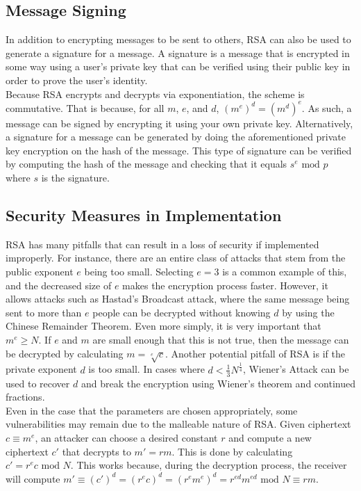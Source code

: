 	\subsection{Message Signing}\label{sec:rsa-sign}
		In addition to encrypting messages to be sent to others, RSA can also be used to generate a signature for a message. A signature is a message that is encrypted in some way using a user's
		private key that can be verified using their public key in order to prove the user's identity.\\

		Because RSA encrypts and decrypts via exponentiation, the scheme is commutative. That is because, for all $m$, $e$, and $d$, $(m^e)^d=(m^d)^e$. As such, a message can be signed by
		encrypting it using your own private key. Alternatively, a signature for a message can be generated by doing the aforementioned private key encryption on the hash of the message. This
		type of signature can be verified by computing the hash of the message and checking that it equals $s^e\text{ mod }p$ where $s$ is the signature.

	\subsection{Security Measures in Implementation}\label{sec:rsa-security}
		RSA has many pitfalls that can result in a loss of security if implemented improperly. For instance, there are an entire class of attacks that stem from the public exponent $e$ being
		too small. Selecting $e=3$ is a common example of this, and the decreased size of $e$ makes the encryption process faster. However, it allows attacks such as Hastad's Broadcast attack,
		where the same message being sent to more than $e$ people can be decrypted without knowing $d$ by using the Chinese Remainder Theorem. Even more simply, it is very important that
		$m^e\ge N$. If $e$ and $m$ are small enough that this is not true, then the message can be decrypted by calculating $m=\sqrt[e]c$. Another potential pitfall of RSA is if the private 
		exponent $d$ is too small. In cases where $d < \frac13N^{\frac14}$, Wiener's Attack can be used to recover $d$ and break the encryption using Wiener's theorem and continued fractions.\\

		Even in the case that the parameters are chosen appropriately, some vulnerabilities may remain due to the malleable nature of RSA. Given ciphertext $c\equiv m^e$, an attacker can choose
		a desired constant $r$ and compute a new ciphertext $c'$ that decrypts to $m'=rm$. This is done by calculating $c'=r^ec\text{ mod }N$. This works because, during the decryption process,
		the receiver will compute $m'\equiv (c')^d=(r^ec)^d=(r^em^e)^d=r^{ed}m^{ed}\text{ mod }N\equiv rm$.\\

